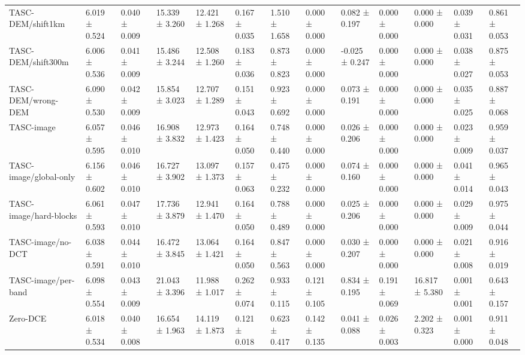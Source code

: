 \begin{table}[t]
\begin{tabular}{lllllllllllll}
TASC-DEM/shift1km & 6.019 ± 0.524 & 0.040 ± 0.009 & 15.339 ± 3.260 & 12.421 ± 1.268 & 0.167 ± 0.035 & 1.510 ± 1.658 & 0.000 ± 0.000 & 0.082 ± 0.197 & 0.000 ± 0.000 & 0.000 ± 0.000 & 0.039 ± 0.031 & 0.861 ± 0.053 \\
TASC-DEM/shift300m & 6.006 ± 0.536 & 0.041 ± 0.009 & 15.486 ± 3.244 & 12.508 ± 1.260 & 0.183 ± 0.036 & 0.873 ± 0.823 & 0.000 ± 0.000 & -0.025 ± 0.247 & 0.000 ± 0.000 & 0.000 ± 0.000 & 0.038 ± 0.027 & 0.875 ± 0.053 \\
TASC-DEM/wrong-DEM & 6.090 ± 0.530 & 0.042 ± 0.009 & 15.854 ± 3.023 & 12.707 ± 1.289 & 0.151 ± 0.043 & 0.923 ± 0.692 & 0.000 ± 0.000 & 0.073 ± 0.191 & 0.000 ± 0.000 & 0.000 ± 0.000 & 0.035 ± 0.025 & 0.887 ± 0.068 \\
TASC-image & 6.057 ± 0.595 & 0.046 ± 0.010 & 16.908 ± 3.832 & 12.973 ± 1.423 & 0.164 ± 0.050 & 0.748 ± 0.440 & 0.000 ± 0.000 & 0.026 ± 0.206 & 0.000 ± 0.000 & 0.000 ± 0.000 & 0.023 ± 0.009 & 0.959 ± 0.037 \\
TASC-image/global-only & 6.156 ± 0.602 & 0.046 ± 0.010 & 16.727 ± 3.902 & 13.097 ± 1.373 & 0.157 ± 0.063 & 0.475 ± 0.232 & 0.000 ± 0.000 & 0.074 ± 0.160 & 0.000 ± 0.000 & 0.000 ± 0.000 & 0.041 ± 0.014 & 0.965 ± 0.043 \\
TASC-image/hard-blocks & 6.061 ± 0.593 & 0.047 ± 0.010 & 17.736 ± 3.879 & 12.941 ± 1.470 & 0.164 ± 0.050 & 0.788 ± 0.489 & 0.000 ± 0.000 & 0.025 ± 0.206 & 0.000 ± 0.000 & 0.000 ± 0.000 & 0.029 ± 0.009 & 0.975 ± 0.044 \\
TASC-image/no-DCT & 6.038 ± 0.591 & 0.044 ± 0.010 & 16.472 ± 3.845 & 13.064 ± 1.421 & 0.164 ± 0.050 & 0.847 ± 0.563 & 0.000 ± 0.000 & 0.030 ± 0.207 & 0.000 ± 0.000 & 0.000 ± 0.000 & 0.021 ± 0.008 & 0.916 ± 0.019 \\
TASC-image/per-band & 6.098 ± 0.554 & 0.043 ± 0.009 & 21.043 ± 3.396 & 11.988 ± 1.017 & 0.262 ± 0.074 & 0.933 ± 0.115 & 0.121 ± 0.105 & 0.834 ± 0.195 & 0.191 ± 0.069 & 16.817 ± 5.380 & 0.001 ± 0.001 & 0.643 ± 0.157 \\
Zero-DCE & 6.018 ± 0.534 & 0.040 ± 0.008 & 16.654 ± 1.963 & 14.119 ± 1.873 & 0.121 ± 0.018 & 0.623 ± 0.417 & 0.142 ± 0.135 & 0.041 ± 0.088 & 0.026 ± 0.003 & 2.202 ± 0.323 & 0.001 ± 0.000 & 0.911 ± 0.048 \\
\bottomrule
\end{tabular}
\end{table}
